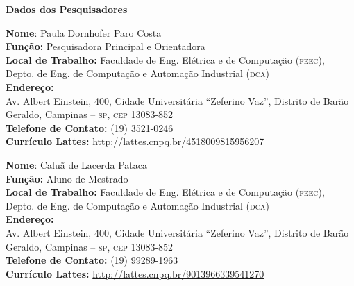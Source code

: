 \documentclass[a4paper,11pt,titlepage,singlespacing]{article}
\begin{document}
\begin{titlepage}
\noindent \Large{\textbf{Dados dos Pesquisadores}}\\

\vspace{10pt}
\begin{flushleft}
    \large{\textbf{Nome}: Paula Dornhofer Paro Costa}\\
    \large{\textbf{Função:} Pesquisadora Principal e Orientadora}\\
    \large{\textbf{Local de Trabalho:} Faculdade de Eng. Elétrica e de Computação (\textsc{feec}), \\ Depto. de Eng. de Computação e Automação Industrial (\textsc{dca})}\\
    \large{\textbf{Endereço:} \\Av. Albert Einstein, 400, Cidade Universitária ``Zeferino Vaz'', Distrito de Barão Geraldo, Campinas – \textsc{sp}, \textsc{cep} 13083-852}\\
    \large{\textbf{Telefone de Contato:} (19) 3521-0246 }\\
    \large{\textbf{Currículo Lattes:} \url{http://lattes.cnpq.br/4518009815956207}}\\
\end{flushleft}

\vspace{10pt}

\begin{flushleft}
    \large{\textbf{Nome}: Caluã de Lacerda Pataca }\\
    \large{\textbf{Função:} Aluno de Mestrado}\\
    \large{\textbf{Local de Trabalho:} Faculdade de Eng. Elétrica e de Computação (\textsc{feec}), \\ Depto. de Eng. de Computação e Automação Industrial (\textsc{dca})}\\
    \large{\textbf{Endereço:} \\Av. Albert Einstein, 400, Cidade Universitária ``Zeferino Vaz'', Distrito de Barão Geraldo, Campinas – \textsc{sp}, \textsc{cep} 13083-852}\\
    \large{\textbf{Telefone de Contato:} (19) 99289-1963 }\\
    \large{\textbf{Currículo Lattes:} \url{http://lattes.cnpq.br/9013966339541270}}\\
\end{flushleft}

\vspace{10pt}

\end{titlepage}
\end{document}
